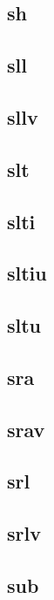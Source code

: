 \subsection*{sh}

\subsection*{sll}

\subsection*{sllv}

\subsection*{slt}

\subsection*{slti}

\subsection*{sltiu}

\subsection*{sltu}

\subsection*{sra}

\subsection*{srav}

\subsection*{srl}

\subsection*{srlv}

\subsection*{sub}


